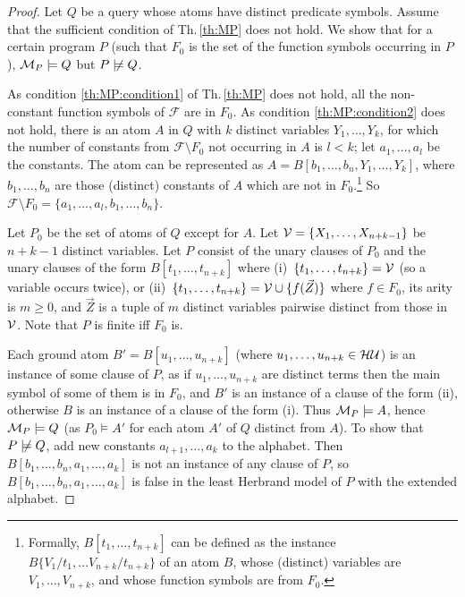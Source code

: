 \documentclass[a4paper]{tlp2}
\newcommand*{\seq}[2][n]  {{#2_{1}, \allowbreak \ldots, \allowbreak #2_{#1}}}
\newcommand*{\notmodels}{\mathrel{\,\not\!\models}}
\newcommand*{\HU}{{\ensuremath{\cal H U}}\xspace}
\newcommand*{\M}{{\ensuremath{\cal M}}\xspace}
\newcommand*{\F}{{\ensuremath{\mathscr F}}\xspace}
\begin{document}
\begin{proof}
Let $Q$ be a query whose atoms have distinct predicate symbols.
Assume that the sufficient condition of Th.\,\ref{th:MP} does not hold.
We show that for a certain program $P$ 
(such that $F_0$ is the set of the function symbols occurring in $P$), 
\linebreak[3]
\mbox{$\M_P\models Q$} but $P\notmodels Q$.

As condition \ref{th:MP:condition1} of Th.\,\ref{th:MP} does not hold, 
all the non-constant function symbols of $\F$ are in $F_0$.
As condition \ref{th:MP:condition2} does not hold, 
there is an atom $A$ in $Q$ with $k$ distinct variables $\seq[k]Y$,
for which the number of constants from $\F\setminus F_0$ not occurring in
$A$ is $l<k$\/; let  $\seq[l]a$  be the constants.
The atom can be represented as $A = B[\seq[n]b,\seq[k]Y]$,
where
$\seq[n]b$ are those (distinct) constants of $A$ which are not in $F_0$.\footnote{Formally, $B[\seq[n+k]t]$ can be defined as the instance
 $B\{V_1/t_1,\ldots V_{n+k}/t_{n+k}\}$ of an atom $B$, whose
 (distinct) variables are $\seq[n+k]V$, and 
 whose function symbols are from $F_0$.
}
So $\F\setminus F_0 = \{ \seq[l]a,\seq[n]b \}$.


Let $P_0$ be the set of atoms of $Q$ except for $A$.
Let ${\cal V} = \{\seq[n+k-1]X\}$ be $n+k-1$ distinct variables.
Let $P$ consist of the unary clauses of $P_0$ and the
unary clauses of the form $B[\seq[n+k]t]$ where 
(i)~$\{\seq[n+k]t\} =\cal V $
(so a variable occurs twice),
or (ii)~$\{\seq[n+k]t\} ={\cal V} \cup \{f(\vec Z)\} $
where $f\in F_0$, its arity is $m\geq0$,
and $\vec Z$ is a
tuple of $m$ distinct variables pairwise distinct from those in $\cal V$.
Note that $P$ is finite iff $F_0$ is.



Each ground atom $B'=B[\seq[n+k]u]$ (where $\seq[n+k]u\in\HU$)
is an instance of some clause of $P$,
as if $\seq[n+k]u$ are distinct terms then the main symbol of some of
them is in $F_0$, and $B'$ is an instance of a clause of the form (ii),
otherwise $B$ is an instance of a clause of the form (i).
Thus  $\M_P\models A$, hence $\M_P\models Q$
(as $P_0\models A'$ for each atom $A'$ of $Q$ distinct from $A$).
To show that  $P\notmodels Q$, 
add new constants $a_{l+1},\ldots,a_k$ to the alphabet.
Then $B[\seq[n]b,\seq[k]a]$ is not an instance of any clause of $P$, 
so $B[\seq[n]b,\seq[k]a]$ is false in the least Herbrand model of $P$
with the extended alphabet.
\end{proof}
\end{document}
